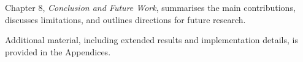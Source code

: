 \documentclass{l4proj}
\begin{document}
Chapter 8, \textit{Conclusion and Future Work}, summarises the main contributions, discusses limitations, and outlines directions for future research.

Additional material, including extended results and implementation details, is provided in the Appendices.





    


\end{document}
